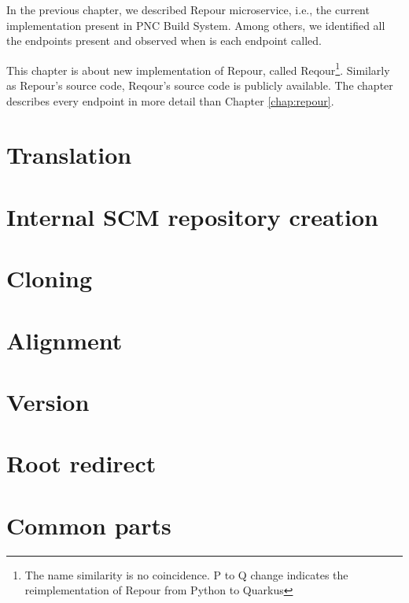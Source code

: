 \documentclass[../../main.tex]{subfiles}
\begin{document}
In the previous chapter, we described Repour microservice, i.e., the current implementation present in PNC Build System. Among others, we identified all the endpoints present and observed when is each endpoint called.

This chapter is about new implementation of Repour, called Reqour\footnote{The name similarity is no coincidence. P to Q change indicates the reimplementation of Repour from Python to Quarkus}. Similarly as Repour's source code, Reqour's source code is publicly available\cite{reqour}. The chapter describes every endpoint in more detail than Chapter \ref{chap:repour}.

\section{Translation}


\section{Internal SCM repository creation}


\section{Cloning}


\section{Alignment}
\label{section:alignment}


\section{Version}


\section{Root redirect}


\section{Common parts}

\end{document}
